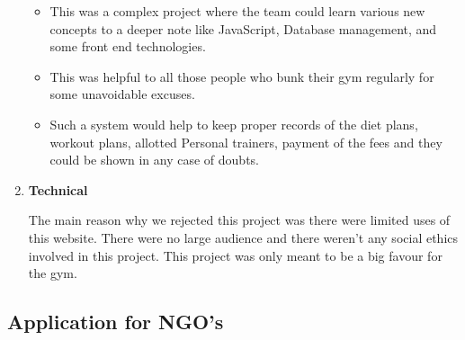 \documentclass[fleqn,10pt]{../SelfArx} %
\begin{document}
\begin{enumerate}
\begin{itemize}
    \item	This was a complex project where the team could learn various new concepts to a deeper note like JavaScript, Database management, and some front end technologies.
  \item		This was helpful to all those people who bunk their gym regularly for some unavoidable excuses.
  \item		Such a system would help to keep proper records of the diet plans, workout plans, allotted
Personal trainers, payment of the fees and they could be shown in any case of doubts.
\end{itemize}

\item \textbf{Technical}

The main reason why we rejected this project was there were limited uses of this website. There were no large audience and there weren’t any social ethics involved in this project.
This project was only meant to be a big favour for the gym.
\end{enumerate}

\subsection {Application for NGO's}
\end{document}
